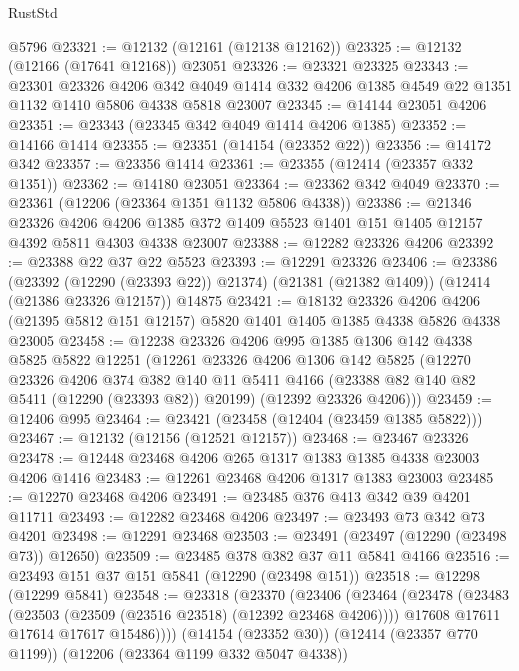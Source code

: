 \begin{lexlean}{RustStd}
\begin{coremodule}
{\begin{coremodule}
{{{{{{{{{{{{{{{{{{{{{{{{{{{{{{{{{{{{{{{{{{{{{{{{{{    @5796
@23321 := @12132 (@12161 (@12138 @12162))
@23325 := @12132 (@12166 (@17641 @12168)) @23051
@23326 := @23321 @23325
@23343 := @23301
    @23326
    @4206
    @342
    @4049
    @1414
    @332
    @4206
    @1385
    @4549
    @22
    @1351
    @1132
    @1410
    @5806
    @4338
    @5818
    @23007
@23345 := @14144 @23051 @4206
@23351 := @23343 (@23345 @342 @4049 @1414 @4206 @1385)
@23352 := @14166 @1414
@23355 := @23351 (@14154 (@23352 @22))
@23356 := @14172 @342
@23357 := @23356 @1414
@23361 := @23355 (@12414 (@23357 @332 @1351))
@23362 := @14180 @23051
@23364 := @23362 @342 @4049
@23370 := @23361 (@12206 (@23364 @1351 @1132 @5806 @4338))
@23386 := @21346
    @23326
    @4206
    @4206
    @1385
    @372
    @1409
    @5523
    @1401
    @151
    @1405
    @12157
    @4392
    @5811
    @4303
    @4338
    @23007
@23388 := @12282 @23326 @4206
@23392 := @23388 @22 @37 @22 @5523
@23393 := @12291 @23326
@23406 := @23386
    (@23392 (@12290 (@23393 @22)) @21374)
    (@21381 (@21382 @1409))
    (@12414 (@21386 @23326 @12157))
    @14875
@23421 := @18132
    @23326
    @4206
    @4206
    (@21395 @5812 @151 @12157)
    @5820
    @1401
    @1405
    @1385
    @4338
    @5826
    @4338
    @23005
@23458 := @12238
    @23326
    @4206
    @995
    @1385
    @1306
    @142
    @4338
    @5825
    @5822
    @12251
    (@12261
      @23326
      @4206
      @1306
      @142
      @5825
      (@12270
        @23326
        @4206
        @374
        @382
        @140
        @11
        @5411
        @4166
        (@23388 @82 @140 @82 @5411 (@12290 (@23393 @82)) @20199)
        (@12392 @23326 @4206)))
@23459 := @12406 @995
@23464 := @23421 (@23458 (@12404 (@23459 @1385 @5822)))
@23467 := @12132 (@12156 (@12521 @12157))
@23468 := @23467 @23326
@23478 := @12448 @23468 @4206 @265 @1317 @1383 @1385 @4338 @23003 @4206 @1416
@23483 := @12261 @23468 @4206 @1317 @1383 @23003
@23485 := @12270 @23468 @4206
@23491 := @23485 @376 @413 @342 @39 @4201 @11711
@23493 := @12282 @23468 @4206
@23497 := @23493 @73 @342 @73 @4201
@23498 := @12291 @23468
@23503 := @23491 (@23497 (@12290 (@23498 @73)) @12650)
@23509 := @23485 @378 @382 @37 @11 @5841 @4166
@23516 := @23493 @151 @37 @151 @5841 (@12290 (@23498 @151))
@23518 := @12298 (@12299 @5841)
@23548 := @23318
    (@23370
      (@23406
        (@23464
          (@23478
            (@23483 (@23503 (@23509 (@23516 @23518) (@12392 @23468 @4206))))
            @17608
            @17611
            @17614
            @17617
            @15486))))
    (@14154 (@23352 @30))
    (@12414 (@23357 @770 @1199))
    (@12206 (@23364 @1199 @332 @5047 @4338))
}}}}}}}}}}}}}}}}}}}}}}}}}}}}}}}}}}}}}}}}}}}}}}}}}}
\end{coremodule}}
\end{coremodule}
\end{lexlean}
